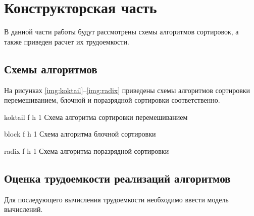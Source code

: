 \chapter{Конструкторская часть}
В данной части работы будут рассмотрены схемы алгоритмов сортировок, а также приведен расчет их трудоемкости.





\section{Схемы алгоритмов}
На рисунках \ref{img:koktail}--\ref{img:radix} приведены схемы алгоритмов сортировки перемешиванием, блочной и поразрядной сортировки соответственно.

{koktail} %
{f} %
{h} %
{1\textwidth} %
{Схема алгоритма сортировки перемешиванием} %



{block} %
{f} %
{h} %
{1\textwidth} %
{Схема алгоритма блочной сортировки} %


{radix} %
{f} %
{h} %
{1\textwidth} %
{Схема алгоритма поразрядной сортировки} %




\section{Оценка трудоемкости реализаций алгоритмов}
Для последующего вычисления трудоемкости необходимо ввести модель вычислений.


